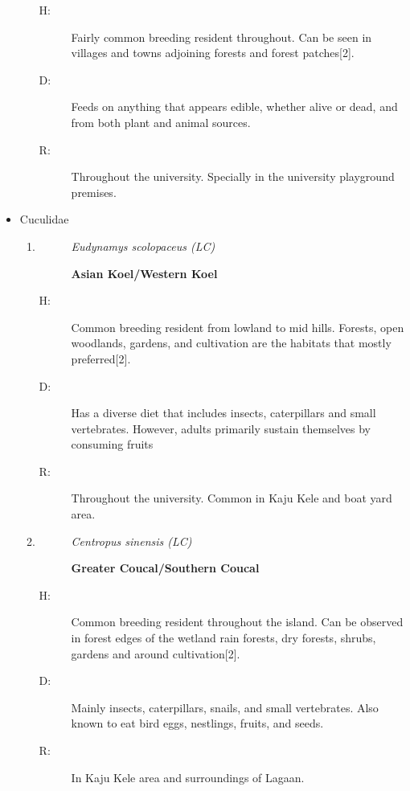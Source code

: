 \begin{itemize}
\begin{enumerate}
\begin{description}
\item[H: ]%
Fairly common breeding resident throughout. Can be seen in villages and towns adjoining forests and forest patches{[}2{]}.%
\item[D: ]%
Feeds on anything that appears edible, whether alive or dead, and from both plant and animal sources.%
\item[R: ]%
Throughout the university. Specially in the university playground premises. %
\end{description}%
\end{enumerate}%
\item%
Cuculidae%
\begin{enumerate}%
\item%
\begin{description}%
\item[]%
\textit{Eudynamys scolopaceus (LC)}%
\item[]%
\textbf{Asian Koel/Western Koel}%
\end{description}%
\begin{description}%
\item[H: ]%
Common breeding resident from lowland to mid hills. Forests, open woodlands, gardens, and cultivation are the habitats that mostly preferred{[}2{]}.%
\item[D: ]%
Has a diverse diet that includes insects, caterpillars and small vertebrates. However, adults primarily sustain themselves by consuming fruits%
\item[R: ]%
Throughout the university. Common in Kaju Kele and boat yard area.%
\end{description}%
\item%
\begin{description}%
\item[]%
\textit{Centropus sinensis (LC)}%
\item[]%
\textbf{Greater Coucal/Southern Coucal}%
\end{description}%
\begin{description}%
\item[H: ]%
Common breeding resident throughout the island. Can be observed in forest edges of the wetland rain forests, dry forests, shrubs, gardens and around cultivation{[}2{]}.%
\item[D: ]%
Mainly insects, caterpillars, snails, and small vertebrates. Also known to eat bird eggs, nestlings, fruits, and seeds.%
\item[R: ]%
In Kaju Kele area and surroundings of Lagaan.%
\end{description}%

\end{enumerate}
\end{itemize}
